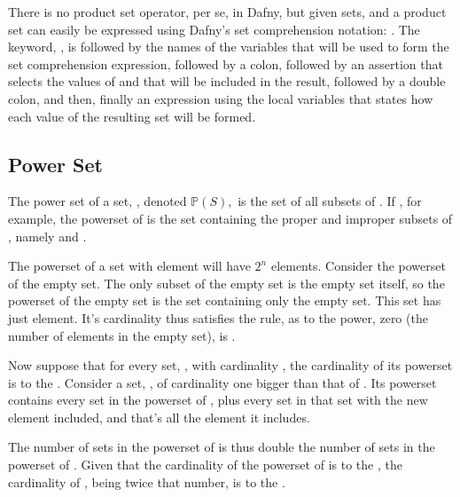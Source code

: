 \documentclass[letterpaper,10pt,english]{sphinxmanual}
\begin{document}
There is no product set operator, per se, in Dafny, but given sets,
 and  a product set can easily be expressed using Dafny’s set
comprehension notation: . The
keyword, , is followed by the names of the variables that will be
used to form the set comprehension expression, followed by a colon,
followed by an assertion that selects the values of  and  that
will be included in the result, followed by a double colon, and then,
finally an expression using the local variables that states how each
value of the resulting set will be formed.


\subsection{Power Set}
\label{\detokenize{07-set-theory:power-set}}
The power set of a set, , denoted \({\mathbb P}(S),\) is the
set of all subsets of . If , for example, the powerset
of  is the set containing the proper and improper subsets of ,
namely  and .

The powerset of a set with  element will have \(2^n\) elements.
Consider the powerset of the empty set. The only subset of the empty
set is the empty set itself, so the powerset of the empty set is the
set containing only the empty set. This set has just  element. It’s
cardinality thus satisfies the rule, as  to the power, zero (the
number of elements in the empty set), is .

Now suppose that for every set, , with cardinality , the
cardinality of its powerset is  to the . Consider a set, ,
of cardinality one bigger than that of . Its powerset contains
every set in the powerset of , plus every set in that set with the
new element included, and that’s all the element it includes.

The number of sets in the powerset of  is thus double the number
of sets in the powerset of . Given that the cardinality of the
powerset of  is  to the , the cardinality of , being
twice that number, is  to the .
\end{document}
